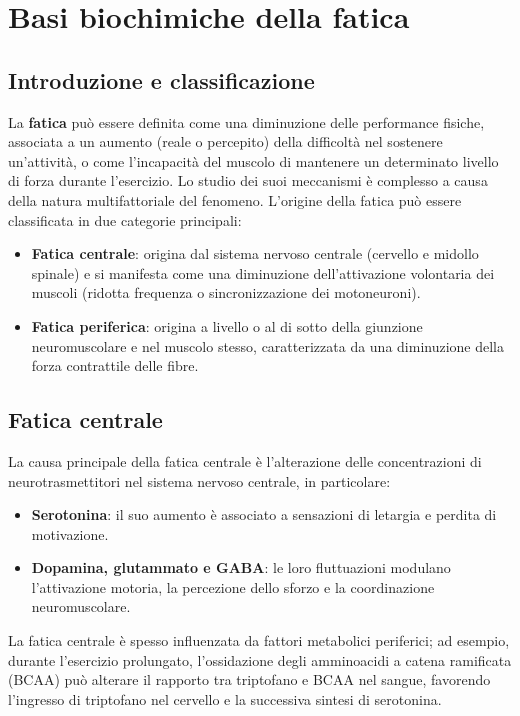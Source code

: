 \documentclass[12pt,a4paper]{report}
\begin{document}


\chapter{Basi biochimiche della fatica}

\section{Introduzione e classificazione}
La \textbf{fatica} può essere definita come una diminuzione delle performance fisiche, associata a un aumento (reale o percepito) della difficoltà nel sostenere un'attività, o come l'incapacità del muscolo di mantenere un determinato livello di forza durante l'esercizio. Lo studio dei suoi meccanismi è complesso a causa della natura multifattoriale del fenomeno.
L'origine della fatica può essere classificata in due categorie principali:
\begin{itemize}
\item \textbf{Fatica centrale}: origina dal sistema nervoso centrale (cervello e midollo spinale) e si manifesta come una diminuzione dell'attivazione volontaria dei muscoli (ridotta frequenza o sincronizzazione dei motoneuroni).
\item \textbf{Fatica periferica}: origina a livello o al di sotto della giunzione neuromuscolare e nel muscolo stesso, caratterizzata da una diminuzione della forza contrattile delle fibre.
\end{itemize}

\section{Fatica centrale}
La causa principale della fatica centrale è l'alterazione delle concentrazioni di neurotrasmettitori nel sistema nervoso centrale, in particolare:
\begin{itemize}
\item \textbf{Serotonina}: il suo aumento è associato a sensazioni di letargia e perdita di motivazione.
\item \textbf{Dopamina, glutammato e GABA}: le loro fluttuazioni modulano l'attivazione motoria, la percezione dello sforzo e la coordinazione neuromuscolare.
\end{itemize}
La fatica centrale è spesso influenzata da fattori metabolici periferici; ad esempio, durante l'esercizio prolungato, l'ossidazione degli amminoacidi a catena ramificata (BCAA) può alterare il rapporto tra triptofano e BCAA nel sangue, favorendo l'ingresso di triptofano nel cervello e la successiva sintesi di serotonina.
\end{document}
